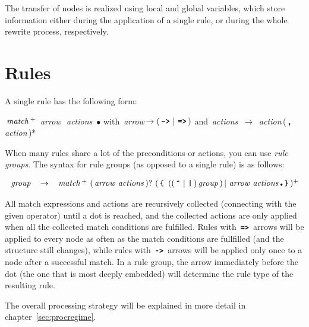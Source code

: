 \documentclass[11pt,a4paper]{article}
\begin{document}
The transfer of nodes is realized using local and global variables, which
store information either during the application of a single rule, or during
the whole rewrite process, respectively.

\section{Rules}

A single rule has the following form:

\newcommand{\nt}[1]{\,\mbox{\emph{#1}}\,}
\newcommand{\tok}[1]{\,\mbox{\texttt{\textbf{#1}}}\,}
\newcommand{\id}{\,\mbox{\texttt{ID}}\,}
\newcommand{\BAR}{\,|\,}
\begin{center}

$\nt{match}^{+}$ \nt{arrow} \nt{actions} {\tiny$\bullet$}
\hspace*{1.2em} with
\nt{arrow}$\rightarrow (\tok{->}\BAR\tok{=>})$ and
\nt{actions} $\rightarrow$ \mbox{\nt{action}(\tok{,}\nt{action})*}
\end{center}

When many rules share a lot of the preconditions or actions, you can use
\emph{rule groups}. The syntax for rule groups (as opposed to a single rule) is
as follows:

\[
\begin{array}{lcl}
\nt{group} & \rightarrow &
   \nt{match}^{+}\  (\nt{arrow} \nt{actions} )?
   \ (\tok{\{}
   \ ((\tok{\^{}} \BAR \tok{|}) \nt{group})
   \BAR
   \mbox{\nt{arrow}} \nt{actions} \mbox{\tiny$\bullet$}
   \tok{\}})^{+}\\
\end{array}
\]

All match expressions and actions are recursively collected (connecting with
the given operator) until a dot is reached, and the collected actions are only
applied when all the collected match conditions are fulfilled. Rules with
\tok{=>} arrows will be applied to every node as often as the match conditions
are fullfilled (and the structure still changes), while rules with \tok{->}
arrows will be applied only once to a node after a successful match. In a rule
group, the arrow immediately before the dot (the one that is most deeply
embedded) will determine the rule type of the resulting rule.

The overall processing strategy will be explained in more detail in chapter~\ref{sec:procregime}.
\end{document}

